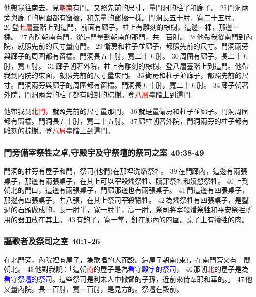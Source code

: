 他帶我往南去，見\textcolor{red}{朝南}有門。又照先前的尺寸，量門洞的柱子和廊子。 25 門洞兩旁與廊子的周圍都有窗櫺，和先量的窗櫺一樣。門洞長五十肘，寬二十五肘。 26 登\textcolor{red}{七層}臺階上到這門，前面有廊子。柱上有雕刻的棕樹，這邊一棵，那邊一棵。 27 內院朝南有門，從這門量到朝南的那門，共一百肘。 28 他帶我從南門到內院，就照先前的尺寸量南門。 29 衛房和柱子並廊子，都照先前的尺寸。門洞兩旁與廊子的周圍都有窗櫺。門洞長五十肘，寬二十五肘。 30 周圍有廊子，長二十五肘，寬五肘。 31 廊子朝著外院，柱上有雕刻的棕樹。登八層臺階上到這門。他帶我到內院的東面，就照先前的尺寸量東門。 33 衛房和柱子並廊子，都照先前的尺寸。門洞兩旁與廊子的周圍都有窗櫺。門洞長五十肘，寬二十五肘。 34 廊子朝著外院，門洞兩旁的柱子都有雕刻的棕樹。登\textcolor{red}{八層}臺階上到這門。

他帶我到\textcolor{red}{北門}，就照先前的尺寸量那門， 36 就是量衛房和柱子並廊子。門洞周圍都有窗櫺。門洞長五十肘，寬二十五肘。 37 廊柱朝著外院，門洞兩旁的柱子都有雕刻的棕樹。登\textcolor{red}{八層}臺階上到這門。


\subsubsection{門旁備宰祭牲之卓,守殿宇及守祭壇的祭司之室 40:38-49}
門洞的柱旁有屋子和門，祭司(他們)在那裡洗燔祭牲。 39 在門廊內，這邊有兩張桌子，那邊有兩張桌子，在其上可以宰殺燔祭牲、贖罪祭牲和贖愆祭牲。 40 上到朝北的門口，這邊有兩張桌子，門廊那邊也有兩張桌子。 41 門這邊有四張桌子，那邊有四張桌子，共八張，在其上祭司宰殺犧牲。 42 為燔祭牲有四張桌子，是鑿過的石頭做成的，長一肘半，寬一肘半，高一肘，祭司將宰殺燔祭牲和平安祭牲所用的器皿放在其上。 43 有鉤子，寬一掌，釘在廊內的四圍。桌子上有犧牲的肉。

\subsubsection{謳歌者及祭司之室 40:1-26}
在北門旁，內院裡有屋子，為歌唱的人而設。這屋子朝南(東)，在南門旁又有一間朝北。 45 他對我說：「這朝\textcolor{red}{南}的屋子是為\textcolor{blue}{看守殿宇的祭司}， 46 那朝\textcolor{red}{北}的屋子是為\textcolor{blue}{看守祭壇的祭司}。這些祭司是利未人中撒督的子孫，近前來侍奉耶和華的。」 47 他又量內院，長一百肘，寬一百肘，是見方的。祭壇在殿前。

